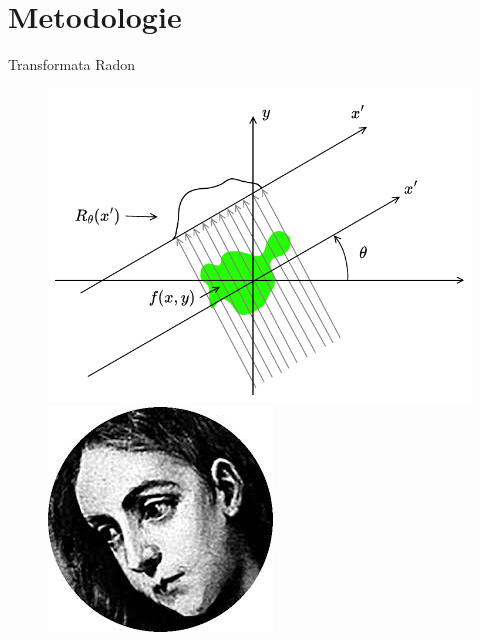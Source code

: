 \documentclass[aspectratio=169,xcolor=dvipsnames]{beamer}
\begin{document}
\section{Metodologie}
\begin{frame}{Transformata Radon}
    \begin{figure}[H]
    \centering
        \begin{minipage}{0.5\linewidth}
            \centering
            \includegraphics[width=\linewidth]{images/radon.pdf}
        \end{minipage}
    \hspace{0.02\linewidth}
        \begin{minipage}{0.2\linewidth}
            \centering
            \includegraphics[width=\linewidth]{images/mary.png}

\end{minipage}
\end{figure}
\end{frame}
\end{document}
